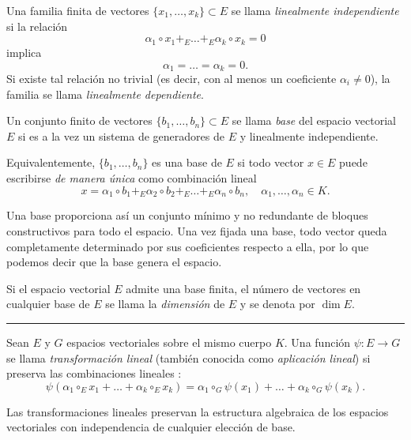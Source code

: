 \medskip

Una familia finita de vectores $\{x_1,\dots,x_k\} \subset E$ se llama \emph{linealmente independiente} si la relación
\[
\alpha_1 \circ x_1 +_E \dots +_E \alpha_k \circ x_k = 0
\]
implica
\[
\alpha_1 = \dots = \alpha_k = 0.
\]
Si existe tal relación no trivial (es decir, con al menos un coeficiente $\alpha_i\neq 0$), la familia se llama \emph{linealmente dependiente}.

\medskip

Un conjunto finito de vectores $\{b_1,\dots,b_n\} \subset E$ se llama \emph{base} del espacio vectorial $E$ si es a la vez un sistema de generadores de $E$ y linealmente independiente.

\medskip

Equivalentemente, $\{b_1,\dots,b_n\}$ es una base de $E$ si todo vector $x \in E$ puede escribirse \emph{de manera única} como combinación lineal
\[
x = \alpha_1 \circ b_1 +_E \alpha_2 \circ b_2 +_E \dots +_E \alpha_n \circ b_n,
\quad \alpha_1,\dots,\alpha_n \in K.
\]

Una base proporciona así un conjunto mínimo y no redundante de bloques constructivos para todo el espacio. Una vez fijada una base, todo vector queda completamente determinado por sus coeficientes respecto a ella, por lo que podemos decir que la base genera el espacio.

\medskip

Si el espacio vectorial $E$ admite una base finita, el número de vectores en cualquier base de $E$ se llama la \emph{dimensión} de $E$ y se denota por $\dim E$.

\bigskip
\hrule
\medskip


Sean $E$ y $G$ espacios vectoriales sobre el mismo cuerpo $K$. Una función
\(
\psi : E \to G
\)
se llama \emph{transformación lineal} (también conocida como \textit{aplicación lineal}) si preserva las combinaciones lineales \cite{iribarren}:
\[
\psi(\alpha_1 \circ_E x_1 + \dots + \alpha_k \circ_E x_k)
=
\alpha_1 \circ_G \psi(x_1) + \dots + \alpha_k \circ_G \psi(x_k).
\]

Las transformaciones lineales preservan la estructura algebraica de los espacios vectoriales con independencia de cualquier elección de base.

